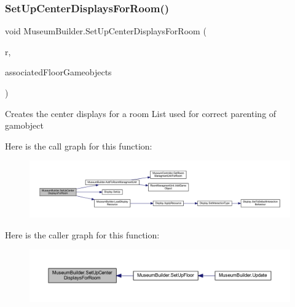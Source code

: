 \subsubsection{\texorpdfstring{Set\+Up\+Center\+Displays\+For\+Room()}{SetUpCenterDisplaysForRoom()}}
{\footnotesize\ttfamily void Museum\+Builder.\+Set\+Up\+Center\+Displays\+For\+Room (\begin{DoxyParamCaption}\item[{\mbox{\hyperlink{class_room}{Room}}}]{r,  }\item[{List$<$ Game\+Object $>$}]{associated\+Floor\+Gameobjects }\end{DoxyParamCaption})\hspace{0.3cm}{\ttfamily [private]}}



Creates the center displays for a room List used for correct parenting of gamobject 

Here is the call graph for this function\+:
\nopagebreak
\begin{figure}[H]
\begin{center}
\leavevmode
\includegraphics[width=350pt]{class_museum_builder_a159e037415aaf348d5a0af9561be8560_cgraph}
\end{center}
\end{figure}
Here is the caller graph for this function\+:
\nopagebreak
\begin{figure}[H]
\begin{center}
\leavevmode
\includegraphics[width=350pt]{class_museum_builder_a159e037415aaf348d5a0af9561be8560_icgraph}
\end{center}
\end{figure}
\mbox{\label{class_museum_builder_adbfb12c00a855fe0f816bc18a51a72e5}} 

